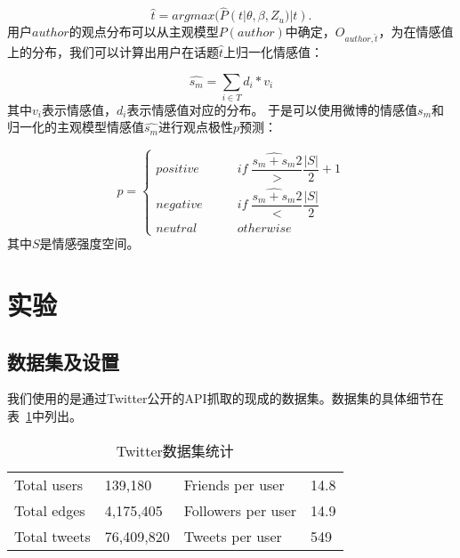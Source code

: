 \begin{equation}
\widehat{t}=argmax(\widehat{P}(t| \theta,\beta ,Z_{u})|t).
\end{equation}
用户$author$的观点分布可以从主观模型$ P(author) $中确定，$ O_{author,\widehat{t}} $，为在情感值上的分布，我们可以计算出用户在话题$ \widehat{t} $上归一化情感值：

\begin{equation}
\widehat{s_{m}}=\sum_{i \in T}d_{i}\ast v_{i}
\end{equation}
其中$ v_{i} $表示情感值，$ d_{i} $表示情感值对应的分布。
于是可以使用微博的情感值$s_m$和归一化的主观模型情感值$ \widehat{s_{m}} $进行观点极性$ p $预测：

\begin{equation}
\label{polarity}
p=  
\begin{cases}
{positive} &  \qquad if \; \dfrac{\widehat{s_{m}+s_m}{2}} > \dfrac{|S|}{2} +1\\
{negative} &  \qquad if \; \dfrac{\widehat{s_{m}+s_m}{2}} < \dfrac{|S|}{2} \\
{neutral}  &   \qquad otherwise \;  
\end{cases}
\end{equation}
其中$ S $是情感强度空间。

\section{实验}
\label{sec5}

\subsection{数据集及设置}
我们使用的是通过Twitter公开的API抓取的现成的数据集。数据集的具体细节在表~\ref{tab5-1}中列出。

\begin{table}
\centering
\caption{Twitter数据集统计}
\label{tab5-1}
\begin{tabular}{ll|ll}
\hline
Total users  & 139,180 & Friends per user & 14.8 \\
Total edges &  4,175,405 & Followers per user & 14.9  \\
Total tweets & 76,409,820 & Tweets per user & 549 \\
\hline
\end{tabular}
\end{table}

